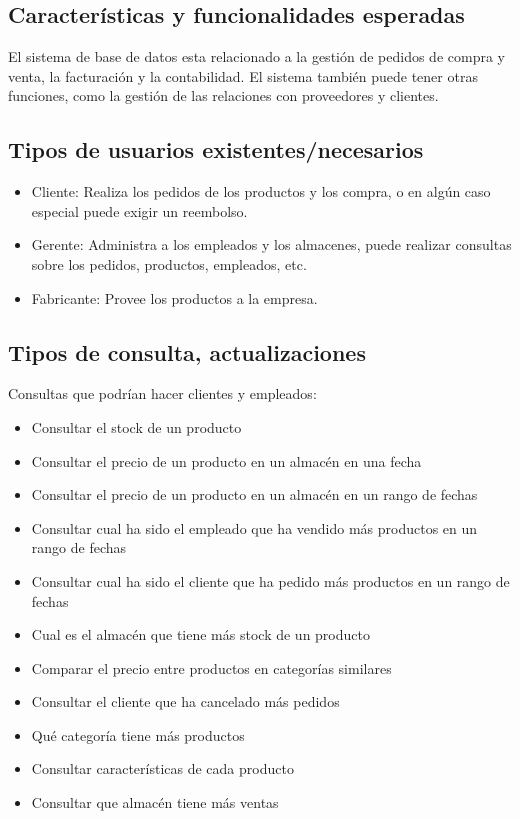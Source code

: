 \documentclass[10pt, a4paper,openany]{report}
\begin{document}
\subsection{Características y funcionalidades esperadas}
\label{subsec:Características y funcionalidades esperadas}

El sistema de base de datos esta relacionado a la gestión de pedidos de compra y venta, la facturación y la contabilidad. El sistema también puede tener otras funciones, como la gestión de las relaciones con proveedores y clientes.

\subsection{Tipos de usuarios existentes/necesarios}
\label{subsec:Tipos de usuarios existentes/necesarios}

\begin{itemize}
	\item Cliente: Realiza los pedidos de los productos y los compra, o en algún caso especial puede exigir un reembolso.
	\item Gerente: Administra a los empleados y los almacenes, puede realizar consultas sobre los pedidos, productos, empleados, etc.
	\item Fabricante: Provee los productos a la empresa.
\end{itemize}

\subsection{Tipos de consulta, actualizaciones }
\label{subsec:Tipos de consulta-actualizaciones }

\noindent Consultas que podrían hacer clientes y empleados:
\begin{itemize}
	\item Consultar el stock de un producto
	\item Consultar el precio de un producto en un almacén en una fecha
	\item Consultar el precio de un producto en un almacén en un rango de fechas
	\item Consultar cual ha sido el empleado que ha vendido más productos en un rango de fechas
	\item Consultar cual ha sido el cliente que ha pedido más productos en un rango de fechas
	\item Cual es el almacén que tiene más stock de un producto
	\item Comparar el precio entre productos en categorías similares
	\item Consultar el cliente que ha cancelado más pedidos
	\item Qué categoría tiene más productos
	\item Consultar características de cada producto
	\item Consultar que almacén tiene más ventas

\end{itemize}
\end{document}
